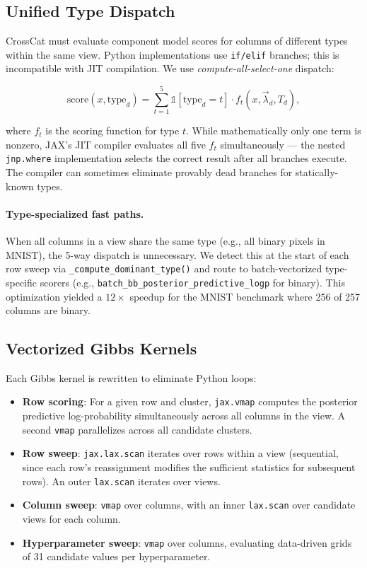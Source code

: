 \documentclass[11pt]{article}
\begin{document}
\subsection{Unified Type Dispatch}

CrossCat must evaluate component model scores for columns of different
types within the same view. Python implementations use \texttt{if/elif}
branches; this is incompatible with JIT compilation. We use
\emph{compute-all-select-one} dispatch:

\begin{equation}
  \mathrm{score}(x, \mathrm{type}_d) = \sum_{t=1}^{5}
  \mathbb{1}[\mathrm{type}_d = t] \cdot f_t(x, \vec{\lambda}_d, T_d),
\end{equation}

where $f_t$ is the scoring function for type $t$. While mathematically
only one term is nonzero, JAX's JIT compiler evaluates all five $f_t$
simultaneously --- the nested \texttt{jnp.where} implementation selects
the correct result after all branches execute. The compiler can sometimes
eliminate provably dead branches for statically-known types.

\paragraph{Type-specialized fast paths.} When all columns in a view
share the same type (e.g., all binary pixels in MNIST), the 5-way
dispatch is unnecessary. We detect this at the start of each row sweep
via \texttt{\_compute\_dominant\_type()} and route to batch-vectorized
type-specific scorers (e.g., \texttt{batch\_bb\_posterior\_predictive\_logp}
for binary). This optimization yielded a $12\times$ speedup for the
MNIST benchmark where 256 of 257 columns are binary.

\subsection{Vectorized Gibbs Kernels}

Each Gibbs kernel is rewritten to eliminate Python loops:

\begin{itemize}
  \item \textbf{Row scoring}: For a given row and cluster,
    \texttt{jax.vmap} computes the posterior predictive log-probability
    simultaneously across all columns in the view. A second \texttt{vmap}
    parallelizes across all candidate clusters.
  \item \textbf{Row sweep}: \texttt{jax.lax.scan} iterates over rows
    within a view (sequential, since each row's reassignment modifies the
    sufficient statistics for subsequent rows). An outer \texttt{lax.scan}
    iterates over views.
  \item \textbf{Column sweep}: \texttt{vmap} over columns, with an inner
    \texttt{lax.scan} over candidate views for each column.
  \item \textbf{Hyperparameter sweep}: \texttt{vmap} over columns,
    evaluating data-driven grids of 31 candidate values per
    hyperparameter.
\end{itemize}
\end{document}
